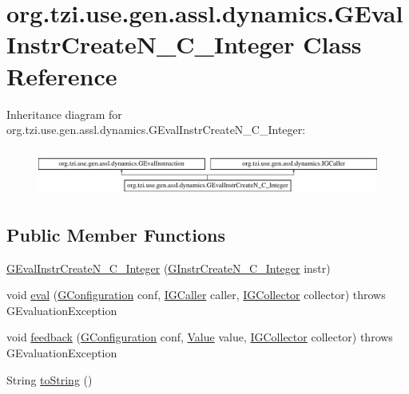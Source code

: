 \hypertarget{classorg_1_1tzi_1_1use_1_1gen_1_1assl_1_1dynamics_1_1_g_eval_instr_create_n___c___integer}{\section{org.\-tzi.\-use.\-gen.\-assl.\-dynamics.\-G\-Eval\-Instr\-Create\-N\-\_\-\-C\-\_\-\-Integer Class Reference}
\label{classorg_1_1tzi_1_1use_1_1gen_1_1assl_1_1dynamics_1_1_g_eval_instr_create_n___c___integer}
}
Inheritance diagram for org.\-tzi.\-use.\-gen.\-assl.\-dynamics.\-G\-Eval\-Instr\-Create\-N\-\_\-\-C\-\_\-\-Integer\-:\begin{figure}[H]
\begin{center}
\leavevmode
\includegraphics[height=1.564246cm]{classorg_1_1tzi_1_1use_1_1gen_1_1assl_1_1dynamics_1_1_g_eval_instr_create_n___c___integer}
\end{center}
\end{figure}
\subsection*{Public Member Functions}
\begin{DoxyCompactItemize}
\item 
\hyperlink{classorg_1_1tzi_1_1use_1_1gen_1_1assl_1_1dynamics_1_1_g_eval_instr_create_n___c___integer_a7b8fe9f0cb6a2e7568cdc46e8d6c3609}{G\-Eval\-Instr\-Create\-N\-\_\-\-C\-\_\-\-Integer} (\hyperlink{classorg_1_1tzi_1_1use_1_1gen_1_1assl_1_1statics_1_1_g_instr_create_n___c___integer}{G\-Instr\-Create\-N\-\_\-\-C\-\_\-\-Integer} instr)
\item 
void \hyperlink{classorg_1_1tzi_1_1use_1_1gen_1_1assl_1_1dynamics_1_1_g_eval_instr_create_n___c___integer_aaae92556424e504f8d9e9daf714cc709}{eval} (\hyperlink{classorg_1_1tzi_1_1use_1_1gen_1_1assl_1_1dynamics_1_1_g_configuration}{G\-Configuration} conf, \hyperlink{interfaceorg_1_1tzi_1_1use_1_1gen_1_1assl_1_1dynamics_1_1_i_g_caller}{I\-G\-Caller} caller, \hyperlink{interfaceorg_1_1tzi_1_1use_1_1gen_1_1assl_1_1dynamics_1_1_i_g_collector}{I\-G\-Collector} collector)  throws G\-Evaluation\-Exception 
\item 
void \hyperlink{classorg_1_1tzi_1_1use_1_1gen_1_1assl_1_1dynamics_1_1_g_eval_instr_create_n___c___integer_a33112941eded71ceab4be26da077e207}{feedback} (\hyperlink{classorg_1_1tzi_1_1use_1_1gen_1_1assl_1_1dynamics_1_1_g_configuration}{G\-Configuration} conf, \hyperlink{classorg_1_1tzi_1_1use_1_1uml_1_1ocl_1_1value_1_1_value}{Value} value, \hyperlink{interfaceorg_1_1tzi_1_1use_1_1gen_1_1assl_1_1dynamics_1_1_i_g_collector}{I\-G\-Collector} collector)  throws G\-Evaluation\-Exception 
\item 
String \hyperlink{classorg_1_1tzi_1_1use_1_1gen_1_1assl_1_1dynamics_1_1_g_eval_instr_create_n___c___integer_a3a0dd48fb6e3575167e4aec04be48678}{to\-String} ()
\end{DoxyCompactItemize}
